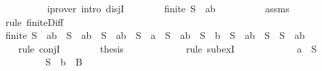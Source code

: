 \begin{isabellebody}
\ \ \ \ \ \ \ \ \isamarkupfalse%
\ {\isacharparenleft}iprover\ intro{\isacharcolon}\ disjI{}{\isacharparenright}\isanewline
\ \ \ \ \ \ \isamarkupfalse%
\ {\isachardoublequoteopen}finite\ {\isacharparenleft}S\ {\isacharminus}\ {\isacharbraceleft}a{\isacharcomma}b{\isacharbraceright}{\isacharparenright}{\isachardoublequoteclose}\isanewline
\ \ \ \ \ \ \ \ \isamarkupfalse%
\ assms{\isacharparenleft}{}{\isacharparenright}\ \isamarkupfalse%
\ {\isacharparenleft}rule\ finite{\isacharunderscore}Diff{\isacharparenright}\isanewline
\ \ \ \ \ \ \isamarkupfalse%
\ \isamarkupfalse%
\ {\isachardoublequoteopen}finite\ {\isacharparenleft}S\ {\isacharminus}\ {\isacharbraceleft}a{\isacharcomma}b{\isacharbraceright}{\isacharparenright}\ {\isasymand}\ {\isacharparenleft}S\ {\isacharequal}\ {\isacharbraceleft}a{\isacharcomma}b{\isacharbraceright}\ {\isasymunion}\ {\isacharparenleft}S\ {\isacharminus}\ {\isacharbraceleft}a{\isacharcomma}b{\isacharbraceright}{\isacharparenright}\ {\isasymor}\ S\ {\isacharequal}\ {\isacharbraceleft}a{\isacharbraceright}\ {\isasymunion}\ {\isacharparenleft}S\ {\isacharminus}\ {\isacharbraceleft}a{\isacharcomma}b{\isacharbraceright}{\isacharparenright}\ {\isasymor}\ S\ {\isacharequal}\ {\isacharbraceleft}b{\isacharbraceright}\ {\isasymunion}\ {\isacharparenleft}S\ {\isacharminus}\ {\isacharbraceleft}a{\isacharcomma}b{\isacharbraceright}{\isacharparenright}\ {\isasymor}\ S\ {\isacharequal}\ {\isacharparenleft}S\ {\isacharminus}\ {\isacharbraceleft}a{\isacharcomma}b{\isacharbraceright}{\isacharparenright}{\isacharparenright}{\isachardoublequoteclose}\isanewline
\ \ \ \ \ \ \ \ \isamarkupfalse%
\ {}\ \isamarkupfalse%
\ {\isacharparenleft}rule\ conjI{\isacharparenright}\isanewline
\ \ \ \ \ \ \isamarkupfalse%
\ {\isacharquery}thesis\isanewline
\ \ \ \ \ \ \ \ \isamarkupfalse%
\ {}\ \isamarkupfalse%
\ {\isacharparenleft}rule\ subexI{\isacharparenright}\isanewline
\ \ \ \ \isamarkupfalse%
\isanewline
\ \ \ \ \ \ \isamarkupfalse%
\ {\isachardoublequoteopen}a\ {\isasymnotin}\ S{\isachardoublequoteclose}\isanewline
\ \ \ \ \ \ \isamarkupfalse%
\ \isamarkupfalse%
\ {}{\isacharcolon}{\isachardoublequoteopen}S\ {\isacharminus}\ {\isacharbraceleft}b{\isacharbraceright}\ {\isasymsubseteq}\ B{\isachardoublequoteclose}\isanewline
\ \ \ \ \ \ \ \ \isamarkupfalse%

\end{isabellebody}

